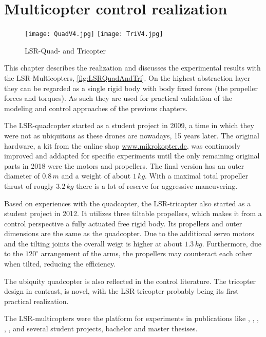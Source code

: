 \chapter{Multicopter control realization}\label{sec:MulticopterRealization}

\begin{figure}[ht]
 \centering
 \texttt{[image: QuadV4.jpg]}
 \hspace{.05\linewidth}
 \texttt{[image: TriV4.jpg]}
 \caption{LSR-Quad- and Tricopter}
 \label{fig:LSRQuadAndTri}
\end{figure}

This chapter describes the realization and discusses the experimental results with the LSR-Multicopters, \autoref{fig:LSRQuadAndTri}.
On the highest abstraction layer they can be regarded as a single rigid body with body fixed forces (the propeller forces and torques).
As such they are used for practical validation of the modeling and control approaches of the previous chapters.

The LSR-quadcopter started as a student project in 2009, a time in which they were not as ubiquitous as these drones are nowadays, 15 years later.
The original hardware, a kit from the online shop \url{www.mikrokopter.de}, was continuosly improved and addapted for specific experiments until the only remaining original parts in 2018 were the motors and propellers.
The final version has an outer diameter of $0.8\,\unit{m}$ and a weight of about $1\,\unit{kg}$.
With a maximal total propeller thrust of rougly $3.2\,\unit{kg}$ there is a lot of reserve for aggressive maneuvering. 

Based on experiences with the quadcopter, the LSR-tricopter also started as a student project in 2012.
It utilizes three tiltable propellers, which makes it from a control perspective a fully actuated free rigid body.
Its propellers and outer dimensions are the same as the quadcopter.
Due to the additional servo motors and the tilting joints the overall weigt is higher at about $1.3\,\unit{kg}$.
Furthermore, due to the $120^\circ$ arrangement of the arms, the propellers may counteract each other when tilted, reducing the efficiency.

The ubiquity quadcopter is also reflected in the control literature.
The tricopter design in contrast, is novel, with the LSR-tricopter probably being its first practical realization.  

The LSR-multicopters were the platform for experiments in publications like \cite{Kastelan:Tricopter}, \cite{Servais:Tricopter}, \cite{Servais:TricopterPendulumLoad}, \cite{Konz:Mechatronics}, \cite{Irscheid:HeavyRopesTricopter}, \cite{Konz:GaussTrackingControl} and several student projects, bachelor and master thesises.
